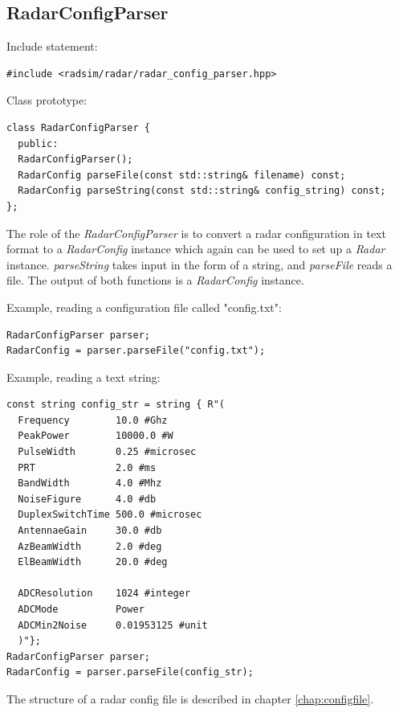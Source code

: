\documentclass[letterpaper]{book}
\begin{document}
\subsection{RadarConfigParser}
Include statement:
\begin{lstlisting}
#include <radsim/radar/radar_config_parser.hpp>
\end{lstlisting}
Class prototype:
\begin{lstlisting}
class RadarConfigParser {
  public:
  RadarConfigParser();
  RadarConfig parseFile(const std::string& filename) const;
  RadarConfig parseString(const std::string& config_string) const;
};
\end{lstlisting}
The role of the \textit{RadarConfigParser} is to convert a radar configuration in text format to a \textit{RadarConfig} instance which again can be used to set up a \textit{Radar} instance. \textit{parseString} takes input in the form of a string, and \textit{parseFile} reads a file. The output of both functions is a \textit{RadarConfig} instance. 

Example, reading a configuration file called "config.txt":
\begin{lstlisting}
RadarConfigParser parser;
RadarConfig = parser.parseFile("config.txt");
\end{lstlisting}

Example, reading a text string:
\begin{lstlisting}
const string config_str = string { R"(
  Frequency        10.0 #Ghz
  PeakPower        10000.0 #W
  PulseWidth       0.25 #microsec
  PRT              2.0 #ms
  BandWidth        4.0 #Mhz
  NoiseFigure      4.0 #db
  DuplexSwitchTime 500.0 #microsec
  AntennaeGain     30.0 #db
  AzBeamWidth      2.0 #deg
  ElBeamWidth      20.0 #deg

  ADCResolution    1024 #integer
  ADCMode          Power
  ADCMin2Noise     0.01953125 #unit
  )"};
RadarConfigParser parser;
RadarConfig = parser.parseFile(config_str);
\end{lstlisting}
The structure of a radar config file is described in chapter \ref{chap:configfile}.
\end{document}

